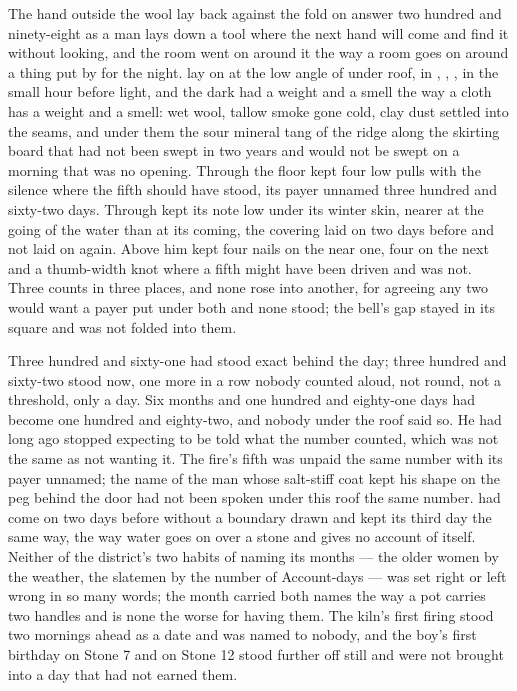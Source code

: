 
The hand outside the wool lay back against the fold on answer two hundred and ninety-eight as a man lays down a tool where the next hand will come and find it without looking, and the room went on around it the way a room goes on around a thing put by for the night.  lay on  at the low angle of  under  roof, in , , , in the small hour before light, and the dark had a weight and a smell the way a cloth has a weight and a smell: wet wool, tallow smoke gone cold, clay dust settled into the seams, and under them the sour mineral tang of the ridge along the skirting board that had not been swept in two years and would not be swept on a morning that was no opening. Through the floor  kept four low pulls with the silence where the fifth should have stood, its payer unnamed three hundred and sixty-two days. Through   kept its note low under its winter skin, nearer at the going of the water than at its coming, the covering laid on two days before and not laid on again. Above him  kept four nails on the near one, four on the next and a thumb-width knot where a fifth might have been driven and was not. Three counts in three places, and none rose into another, for agreeing any two would want a payer put under both and none stood; the bell's gap stayed in its square and was not folded into them.

Three hundred and sixty-one had stood exact behind the day; three hundred and sixty-two stood now, one more in a row nobody counted aloud, not round, not a threshold, only a day. Six months and one hundred and eighty-one days had become one hundred and eighty-two, and nobody under the roof said so. He had long ago stopped expecting to be told what the number counted, which was not the same as not wanting it. The fire's fifth was unpaid the same number with its payer unnamed; the name of the man whose salt-stiff coat kept his shape on the peg behind the door had not been spoken under this roof the same number.  had come on two days before without a boundary drawn and kept its third day the same way, the way water goes on over a stone and gives no account of itself. Neither of the district's two habits of naming its months --- the older women by the weather, the slatemen by the number of Account-days --- was set right or left wrong in so many words; the month carried both names the way a pot carries two handles and is none the worse for having them. The kiln's first firing stood two mornings ahead as a date and was named to nobody, and the boy's first birthday on Stone 7 and  on Stone 12 stood further off still and were not brought into a day that had not earned them.

